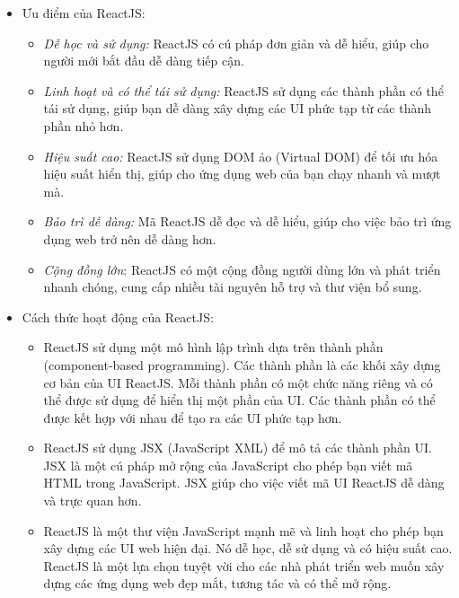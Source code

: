 \begin{itemize}
    \item Ưu điểm của ReactJS:
        \begin{itemize}
            \item \textit{Dễ học và sử dụng:} ReactJS có cú pháp đơn giản và dễ hiểu, giúp cho người mới bắt đầu dễ dàng tiếp cận.
            \item \textit{Linh hoạt và có thể tái sử dụng:} ReactJS sử dụng các thành phần có thể tái sử dụng, giúp bạn dễ dàng xây dựng các UI phức tạp từ các thành phần nhỏ hơn.
            \item \textit{Hiệu suất cao:} ReactJS sử dụng DOM ảo (Virtual DOM) để tối ưu hóa hiệu suất hiển thị, giúp cho ứng dụng web của bạn chạy nhanh và mượt mà.
            \item \textit{Bảo trì dễ dàng:} Mã ReactJS dễ đọc và dễ hiểu, giúp cho việc bảo trì ứng dụng web trở nên dễ dàng hơn.
            \item \textit{Cộng đồng lớn}: ReactJS có một cộng đồng người dùng lớn và phát triển nhanh chóng, cung cấp nhiều tài nguyên hỗ trợ và thư viện bổ sung.
        \end{itemize}
    \item Cách thức hoạt động của ReactJS:
        \begin{itemize}
            \item ReactJS sử dụng một mô hình lập trình dựa trên thành phần (component-based programming). Các thành phần là các khối xây dựng cơ bản của UI ReactJS. Mỗi thành phần có một chức năng riêng và có thể được sử dụng để hiển thị một phần của UI. Các thành phần có thể được kết hợp với nhau để tạo ra các UI phức tạp hơn.
            \item ReactJS sử dụng JSX (JavaScript XML) để mô tả các thành phần UI. JSX là một cú pháp mở rộng của JavaScript cho phép bạn viết mã HTML trong JavaScript. JSX giúp cho việc viết mã UI ReactJS dễ dàng và trực quan hơn.
            \item ReactJS là một thư viện JavaScript mạnh mẽ và linh hoạt cho phép bạn xây dựng các UI web hiện đại. Nó dễ học, dễ sử dụng và có hiệu suất cao. ReactJS là một lựa chọn tuyệt vời cho các nhà phát triển web muốn xây dựng các ứng dụng web đẹp mắt, tương tác và có thể mở rộng.
        \end{itemize}
\end{itemize}


